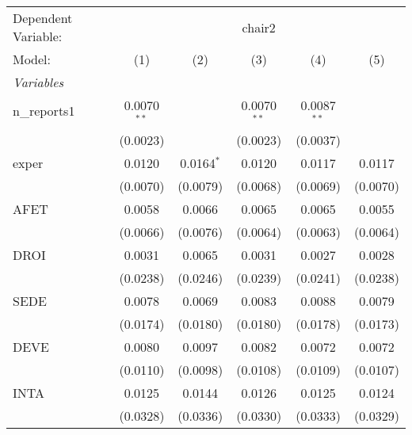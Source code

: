 
\begingroup
\centering
\begin{tabular}{lccccc}
   \tabularnewline \midrule \midrule
   Dependent Variable: & \multicolumn{5}{c}{chair2}\\
   Model:                              & (1)           & (2)          & (3)           & (4)           & (5)\\  
   \midrule
   \emph{Variables}\\
   n\_reports1                         & 0.0070$^{**}$ &              & 0.0070$^{**}$ & 0.0087$^{**}$ &   \\   
                                       & (0.0023)      &              & (0.0023)      & (0.0037)      &   \\   
   exper                               & 0.0120        & 0.0164$^{*}$ & 0.0120        & 0.0117        & 0.0117\\   
                                       & (0.0070)      & (0.0079)     & (0.0068)      & (0.0069)      & (0.0070)\\   
   AFET                                & 0.0058        & 0.0066       & 0.0065        & 0.0065        & 0.0055\\   
                                       & (0.0066)      & (0.0076)     & (0.0064)      & (0.0063)      & (0.0064)\\   
   DROI                                & 0.0031        & 0.0065       & 0.0031        & 0.0027        & 0.0028\\   
                                       & (0.0238)      & (0.0246)     & (0.0239)      & (0.0241)      & (0.0238)\\   
   SEDE                                & 0.0078        & 0.0069       & 0.0083        & 0.0088        & 0.0079\\   
                                       & (0.0174)      & (0.0180)     & (0.0180)      & (0.0178)      & (0.0173)\\   
   DEVE                                & 0.0080        & 0.0097       & 0.0082        & 0.0072        & 0.0072\\   
                                       & (0.0110)      & (0.0098)     & (0.0108)      & (0.0109)      & (0.0107)\\   
   INTA                                & 0.0125        & 0.0144       & 0.0126        & 0.0125        & 0.0124\\   
                                       & (0.0328)      & (0.0336)     & (0.0330)      & (0.0333)      & (0.0329)\\   

\end{tabular}

